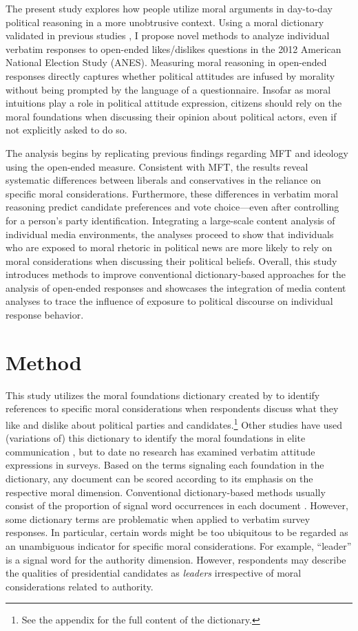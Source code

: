 \documentclass[12pt]{article}
\begin{document}
The present study explores how people utilize moral arguments in day-to-day political reasoning in a more unobtrusive context. Using a moral dictionary validated in previous studies \citep{graham2009liberals}, I propose novel methods to analyze individual verbatim responses to open-ended likes/dislikes questions in the 2012 American National Election Study (ANES). Measuring moral reasoning in open-ended responses directly captures whether political attitudes are infused by morality without being prompted by the language of a questionnaire. Insofar as moral intuitions play a role in political attitude expression, citizens should rely on the moral foundations when discussing their opinion about political actors, even if not explicitly asked to do so.

The analysis begins by replicating previous findings regarding MFT and ideology using the open-ended measure. Consistent with MFT, the results reveal systematic differences between liberals and conservatives in the reliance on specific moral considerations. Furthermore, these differences in verbatim moral reasoning predict candidate preferences and vote choice---even after controlling for a person's party identification. Integrating a large-scale content analysis of individual media environments, the analyses proceed to show that individuals who are exposed to moral rhetoric in political news are more likely to rely on moral considerations when discussing their political beliefs. Overall, this study introduces methods to improve conventional dictionary-based approaches for the analysis of open-ended responses and showcases the integration of media content analyses to trace the influence of exposure to political discourse on individual response behavior.


\section*{Method}

This study utilizes the moral foundations dictionary created by \citet{graham2009liberals} to identify references to specific moral considerations when respondents discuss what they like and dislike about political parties and candidates.\footnote{See the appendix for the full content of the dictionary.} Other studies have used (variations of) this dictionary to identify the moral foundations in elite communication \citep[e.g.][]{clifford2015concerns}, but to date no research has examined verbatim attitude expressions in surveys. Based on the terms signaling each foundation in the dictionary, any document can be scored according to its emphasis on the respective moral dimension. Conventional dictionary-based methods usually consist of the proportion of signal word occurrences in each document \citep[e.g.][]{graham2009liberals}. However, some dictionary terms are problematic when applied to verbatim survey responses. In particular, certain words might be too ubiquitous to be regarded as an unambiguous indicator for specific moral considerations. For example, ``leader'' is a signal word for the authority dimension. However, respondents may describe the qualities of presidential candidates as \textit{leaders} irrespective of moral considerations related to authority.
\end{document}
